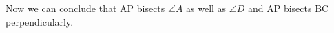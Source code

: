 \documentclass[journal,12pt,twocolumn]{IEEEtran}
\renewcommand\thesection{\arabic{section}}
\begin{document}
Now we can conclude that AP bisects $\angle A$ as well as $\angle D$ and AP bisects BC perpendicularly.


\renewcommand{\theequation}{\theenumi}
%
\end{document}
